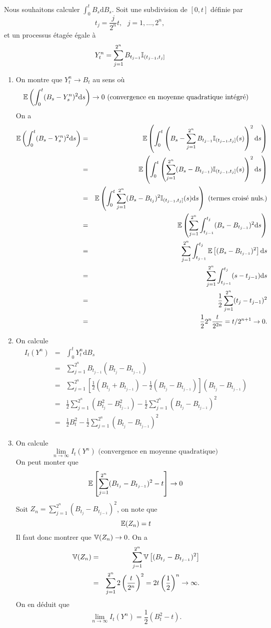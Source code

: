 \begin{ex}
Nous souhaitons calculer $\int_0^t B_s\text{d}B_s$. Soit une subdivision de $[0,t]$ définie par 
$$
t_j = \frac{j}{2^n}t,\text{ }j = 1,\ldots, 2^n,
$$
et un processus étagée égale à 
$$
Y_t^n = \sum_{j = 1}^{2^n}B_{t_{j-1}}\mathbb{I}_{(t_{j-1}, t_j]}
$$
\begin{enumerate}
\item On montre que $Y_t^n\rightarrow B_t$ au sens où
$$
\mathbb{E}\left(\int_0^t(B_s- Y_s^n)^2\text{d}s\right)\rightarrow0 \text{ (convergence en moyenne quadratique intégré)}
$$
On a 
\begin{eqnarray*}
\mathbb{E}\left(\int_0^t(B_s- Y_s^n)^2\text{d}s\right)&=&
\mathbb{E}\left(\int_0^t \left(B_s- \sum_{j=1}^{2^n}B_{t_{j-1}}\mathbb{I}_{(t_{j-1}, t_{j}]}(s)\right)^2\text{d}s\right)\\
&=&\mathbb{E}\left(\int_0^t \left( \sum_{j=1}^{2^n}(B_s-B_{t_{j-1}})\mathbb{I}_{(t_{j-1}, t_{j}]}(s)\right)^2\text{d}s\right)\\
&=&\mathbb{E}\left(\int_0^t \sum_{j=1}^{2^n}(B_s-B_{t_j})^2\mathbb{I}_{(t_{j-1}, t_{j}]}(s)\text{d}s\right) \text{ (termes croisé nuls.)}\\
&=&\mathbb{E}\left( \sum_{j=1}^{2^n}\int_{t_{j-1}}^{t_{j}}(B_s-B_{t_{j-1}})^2\text{d}s\right)\\
&=&\sum_{j=1}^{2^n}\int_{t_{j-1}}^{t_{j}}\mathbb{E}\left[(B_s-B_{t_{j-1}})^2\right]\text{d}s\\
&=&\sum_{j=1}^{2^n}\int_{t_{j-1}}^{t_{j}}(s-t_{j-1})\text{d}s\\
&=&\frac{1}{2}\sum_{j=1}^{2^n}(t_{j}-t_{j-1})^2\\
&=&\frac{1}{2}2^n\frac{t}{2^{2n}} = t/ 2^{n+1}\rightarrow 0.
\end{eqnarray*}
\item On calcule 
\begin{eqnarray*}
I_t(Y^n) &=& \int_0^tY^n_t\text{d}B_s\\
&=& \sum_{j =1}^{2^n}B_{t_{j-1}}(B_{t_j}- B_{t_{j-1}})\\
&=& \sum_{j =1}^{2^n}\left[\frac{1}{2}(B_{t_j} + B_{t_{j-1}})- \frac{1}{2}(B_{t_j}- B_{t_{j-1}})\right](B_{t_j}- B_{t_{j-1}})\\
&=&\frac{1}{2}\sum_{j =1}^{2^n}(B_{t_j}^2 - B_{t_{j-1}}^2) - \frac{1}{2}\sum_{j =1}^{2^n}(B_{t_j}- B_{t_{j-1}})^2\\
&=& \frac{1}{2}B_t^2 - \frac{1}{2}\sum_{j =1}^{2^n}(B_{t_j}- B_{t_{j-1}})^2
\end{eqnarray*}
\item On calcule 
$$
\underset{n\rightarrow \infty}{\lim} I_t(Y^n)\text{ (convergence en moyenne quadratique) }
$$
On peut monter que 
$$
\mathbb{E}\left[\sum_{j =1}^{2^n}(B_{t_j}- B_{t_{j-1}})^2 - t\right]\rightarrow 0
$$
Soit $Z_n= \sum_{j =1}^{2^n}(B_{t_j}- B_{t_{j-1}})^2$, on note que 
$$
\mathbb{E}(Z_n) = t
$$
Il faut donc montrer que $\mathbb{V}(Z_n) \rightarrow 0$. On a 
\begin{eqnarray*}
\mathbb{V}(Z_n) &=& \sum_{j = 1}^{2^n} \mathbb{V}\left[(B_{t_j}-B_{t_{j-1}})^2\right]\\
&=&\sum_{j = 1}^{2^n}2\left(\frac{t}{2^n}\right)^2 = 2t\left(\frac{1}{2}\right)^n\rightarrow \infty.
\end{eqnarray*}
On en déduit que 
$$
\underset{n\rightarrow \infty}{\lim} I_t(Y^n) = \frac{1}{2}(B_t^2 - t).
$$


\end{enumerate}
\end{ex}
